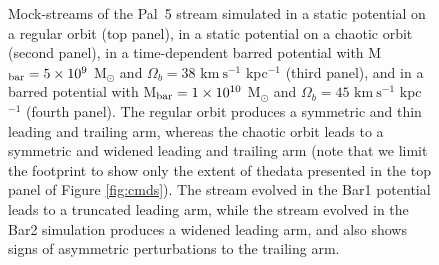 \documentclass[twocolumn]{aastex62}
\newcommand{\kms}{\ensuremath{\textrm{km}~\textrm{s}^{-1}}}
\begin{document}
\begin{figure}
\caption{Mock-streams of the Pal~5 stream simulated in a static potential on a regular orbit (top panel), in a static potential on a chaotic orbit (second panel), in a time-dependent barred potential with M$_{\rm bar} = 5\times 10^9$ M$_{\odot}$ and $\Omega_b = 38$ $\kms$ kpc$^{-1}$ (third panel), and in a barred potential with M$_{\rm bar} = 1\times 10^{10}$ M$_{\odot}$ and $\Omega_b = 45$ $\kms$ kpc$^{-1}$ (fourth panel). The regular orbit produces a symmetric and thin leading and trailing arm,  whereas the chaotic orbit leads to a symmetric and widened leading and trailing arm (note that we limit the footprint to show  only the extent of thedata presented in the top panel of Figure \ref{fig:cmds}). The stream evolved in the Bar1 potential leads to a truncated leading arm, while the stream evolved in the Bar2 simulation produces a widened leading arm, and also shows signs of asymmetric perturbations to the trailing arm. }
\label{fig:sims}
\end{figure}
\end{document}
